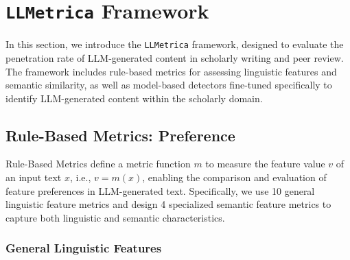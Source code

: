 
\section{\texttt{LLMetrica} Framework}
\label{sec: LLMetria}
In this section, we introduce the \texttt{LLMetrica} framework, designed to evaluate the penetration rate of LLM-generated content in scholarly writing and peer review. 
The framework includes rule-based metrics for assessing linguistic features and semantic similarity, as well as model-based detectors fine-tuned specifically to identify LLM-generated content within the scholarly domain.



\subsection{Rule-Based Metrics: Preference}  
\label{sec:metric}
Rule-Based Metrics define a metric function $m$ to measure the feature value $v$ of an input text $x$, i.e., $v=m(x)$, enabling the comparison and evaluation of feature preferences in LLM-generated text. 
Specifically, we use 10 general linguistic feature metrics and design 4 specialized semantic feature metrics to capture both linguistic and semantic characteristics.



\subsubsection{General Linguistic Features}


